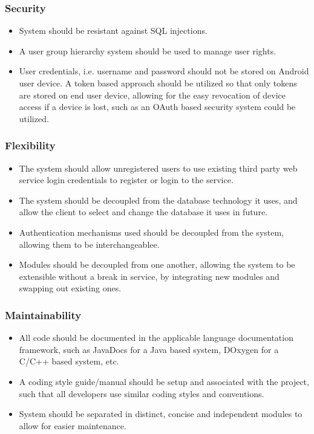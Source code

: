 \documentclass[a4paper,10pt]{article}
\begin{document}
\subsubsection{Security}
\begin{itemize}
\item System should be resistant against SQL injections.
\item A user group hierarchy system should be used to manage user rights.
\item User credentials, i.e. username and password should not be stored on Android user device. A token based approach should be utilized so that only tokens are stored on end user device, allowing for the easy revocation of device access if a device is lost, such as an OAuth based security system could be utilized.
\end{itemize}

\subsubsection{Flexibility}
\begin{itemize}
\item The system should allow unregistered users to use existing third party web service login credentials to register or login to the service.
\item The system should be decoupled from the database technology it uses, and allow the client to select and change the database it uses in future.
\item Authentication mechanisms used should be decoupled from the system, allowing them to be interchangeablee.
\item Modules should be decoupled from one another, allowing the system to be extensible without a break in service, by integrating new modules and swapping out existing ones. 
\end{itemize}

\subsubsection{Maintainability}
\begin{itemize}
\item All code should be documented in the applicable language documentation framework, such as JavaDocs for a Java based system, DOxygen for a C/C++ based system, etc.
\item A coding style guide/manual should be setup and associated with the project, such that all developers use similar coding styles and conventions.
\item System should be separated in distinct, concise and independent modules to allow for easier maintenance.
\end{itemize}
\end{document}
